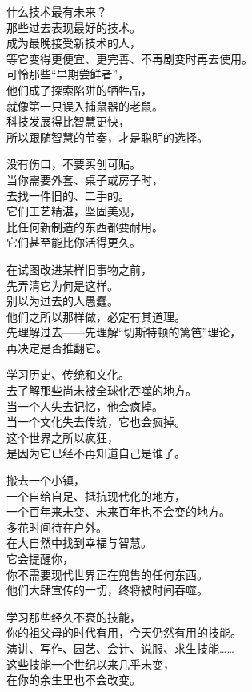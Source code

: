 \documentclass[
]{article}
\begin{document}
什么技术最有未来？\\
那些过去表现最好的技术。\\
成为最晚接受新技术的人，\\
等它变得更便宜、更完善、不再剧变时再去使用。\\
可怜那些``早期尝鲜者''，\\
他们成了探索陷阱的牺牲品，\\
就像第一只误入捕鼠器的老鼠。\\
科技发展得比智慧更快，\\
所以跟随智慧的节奏，才是聪明的选择。

没有伤口，不要买创可贴。\\
当你需要外套、桌子或房子时，\\
去找一件旧的、二手的。\\
它们工艺精湛，坚固美观，\\
比任何新制造的东西都要耐用。\\
它们甚至能比你活得更久。

在试图改进某样旧事物之前，\\
先弄清它为何是这样。\\
别以为过去的人愚蠢。\\
他们之所以那样做，必定有其道理。\\
先理解过去------先理解``切斯特顿的篱笆''理论，\\
再决定是否推翻它。

学习历史、传统和文化。\\
去了解那些尚未被全球化吞噬的地方。\\
当一个人失去记忆，他会疯掉。\\
当一个文化失去传统，它也会疯掉。\\
这个世界之所以疯狂，\\
是因为它已经不再知道自己是谁了。

搬去一个小镇，\\
一个自给自足、抵抗现代化的地方，\\
一个百年来未变、未来百年也不会变的地方。\\
多花时间待在户外。\\
在大自然中找到幸福与智慧。\\
它会提醒你，\\
你不需要现代世界正在兜售的任何东西。\\
他们大肆宣传的一切，终将被时间吞噬。

学习那些经久不衰的技能，\\
你的祖父母的时代有用，今天仍然有用的技能。\\
演讲、写作、园艺、会计、说服、求生技能\ldots\ldots{}\\
这些技能一个世纪以来几乎未变，\\
在你的余生里也不会改变。
\end{document}
